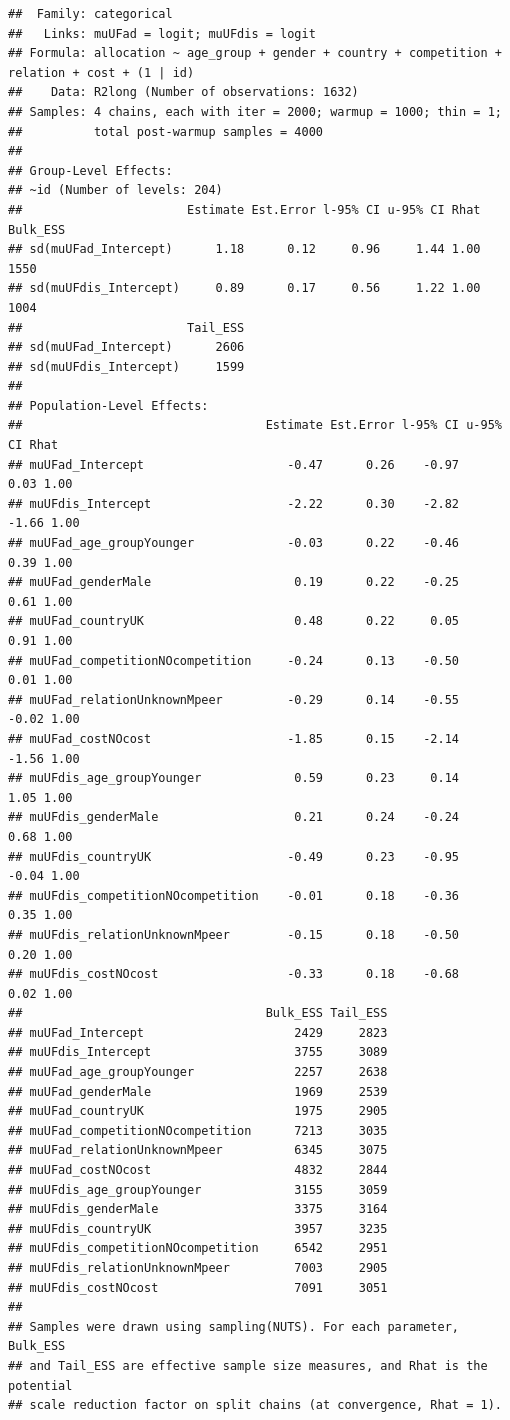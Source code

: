 \documentclass[
]{article}
\begin{document}
\begin{verbatim}
##  Family: categorical 
##   Links: muUFad = logit; muUFdis = logit 
## Formula: allocation ~ age_group + gender + country + competition + relation + cost + (1 | id) 
##    Data: R2long (Number of observations: 1632) 
## Samples: 4 chains, each with iter = 2000; warmup = 1000; thin = 1;
##          total post-warmup samples = 4000
## 
## Group-Level Effects: 
## ~id (Number of levels: 204) 
##                       Estimate Est.Error l-95% CI u-95% CI Rhat Bulk_ESS
## sd(muUFad_Intercept)      1.18      0.12     0.96     1.44 1.00     1550
## sd(muUFdis_Intercept)     0.89      0.17     0.56     1.22 1.00     1004
##                       Tail_ESS
## sd(muUFad_Intercept)      2606
## sd(muUFdis_Intercept)     1599
## 
## Population-Level Effects: 
##                                  Estimate Est.Error l-95% CI u-95% CI Rhat
## muUFad_Intercept                    -0.47      0.26    -0.97     0.03 1.00
## muUFdis_Intercept                   -2.22      0.30    -2.82    -1.66 1.00
## muUFad_age_groupYounger             -0.03      0.22    -0.46     0.39 1.00
## muUFad_genderMale                    0.19      0.22    -0.25     0.61 1.00
## muUFad_countryUK                     0.48      0.22     0.05     0.91 1.00
## muUFad_competitionNOcompetition     -0.24      0.13    -0.50     0.01 1.00
## muUFad_relationUnknownMpeer         -0.29      0.14    -0.55    -0.02 1.00
## muUFad_costNOcost                   -1.85      0.15    -2.14    -1.56 1.00
## muUFdis_age_groupYounger             0.59      0.23     0.14     1.05 1.00
## muUFdis_genderMale                   0.21      0.24    -0.24     0.68 1.00
## muUFdis_countryUK                   -0.49      0.23    -0.95    -0.04 1.00
## muUFdis_competitionNOcompetition    -0.01      0.18    -0.36     0.35 1.00
## muUFdis_relationUnknownMpeer        -0.15      0.18    -0.50     0.20 1.00
## muUFdis_costNOcost                  -0.33      0.18    -0.68     0.02 1.00
##                                  Bulk_ESS Tail_ESS
## muUFad_Intercept                     2429     2823
## muUFdis_Intercept                    3755     3089
## muUFad_age_groupYounger              2257     2638
## muUFad_genderMale                    1969     2539
## muUFad_countryUK                     1975     2905
## muUFad_competitionNOcompetition      7213     3035
## muUFad_relationUnknownMpeer          6345     3075
## muUFad_costNOcost                    4832     2844
## muUFdis_age_groupYounger             3155     3059
## muUFdis_genderMale                   3375     3164
## muUFdis_countryUK                    3957     3235
## muUFdis_competitionNOcompetition     6542     2951
## muUFdis_relationUnknownMpeer         7003     2905
## muUFdis_costNOcost                   7091     3051
## 
## Samples were drawn using sampling(NUTS). For each parameter, Bulk_ESS
## and Tail_ESS are effective sample size measures, and Rhat is the potential
## scale reduction factor on split chains (at convergence, Rhat = 1).
\end{verbatim}
\end{document}
